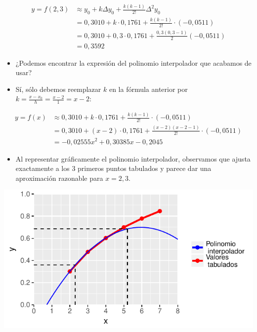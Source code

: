 \documentclass[]{book}
\providecommand{\tightlist}{%
  \setlength{\itemsep}{0pt}\setlength{\parskip}{0pt}}
\begin{document}
\[
\begin{aligned}
y = f(2,3) &\approx y_0 + k \Delta y_0 + \frac{k(k-1)}{2!}\Delta^2 y_0 \\
    & = 0,3010 + k \cdot 0,1761 + \frac{k(k-1)}{2!} \cdot (-0,0511) \\
  & = 0,3010 + 0,3 \cdot 0,1761 + \frac{0,3 (0,3-1)}{2} (-0,0511) \\
  & = 0,3592
\end{aligned}
\]

\begin{itemize}
\tightlist
\item
  ¿Podemos encontrar la expresión del polinomio interpolador que acabamos de usar?
\item
  Sí, sólo debemos reemplazar \(k\) en la fórmula anterior por \(k = \frac{x-x_0}{h} = \frac{x-2}{1} = x-2\):
\end{itemize}

\[
\begin{aligned}
y = f(x) &\approx 0,3010 + k \cdot 0,1761 + \frac{k(k-1)}{2!} \cdot (-0,0511) \\
    & = 0,3010 + (x-2) \cdot 0,1761 + \frac{(x-2)(x-2-1)}{2!} \cdot (-0,0511) \\
  & = -0,02555 x^2 + 0,30385 x - 0,2045
\end{aligned}
\]

\begin{itemize}
\tightlist
\item
  Al representar gráficamente el polinomio interpolador, observamos que ajusta exactamente a los 3 primeros puntos tabulados y parece dar una aproximación razonable para \(x = 2,3\).
\end{itemize}

\begin{center}\includegraphics[width=0.7\linewidth]{Plots/U4/Unidad4_g2} \end{center}
\end{document}
